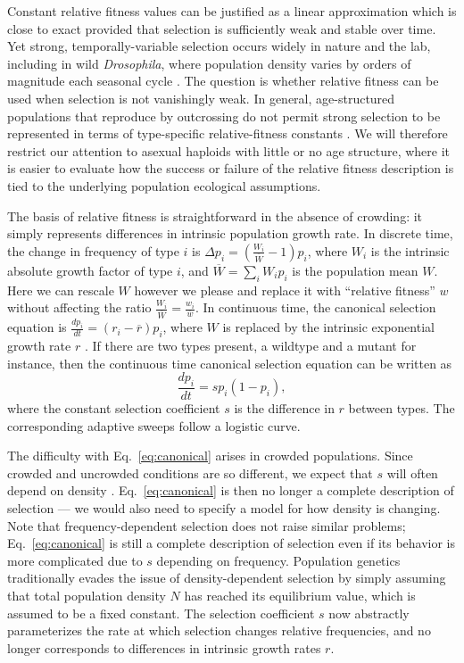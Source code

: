 \documentclass[12pt]{article}
\begin{document}
Constant relative fitness values can be justified as a linear approximation \cite[pp. 277]{ewens_2004} \citep[Chap. 4]{charlesworth_1994} which is close to exact provided that selection is sufficiently weak and stable over time. Yet strong, temporally-variable selection occurs widely in nature and the lab, including in wild \textit{Drosophila}, where population density varies by orders of magnitude each seasonal cycle \citep{messer_2016,bergland_14}. The question is whether relative fitness can be used when selection is not vanishingly weak. In general, age-structured populations that reproduce by outcrossing do not permit strong selection to be represented in terms of type-specific relative-fitness constants \citep[Chap. 4]{charlesworth_1994}. We will therefore restrict our attention to asexual haploids with little or no age structure, where it is easier to evaluate how the success or failure of the relative fitness description is tied to the underlying population ecological assumptions. 

The basis of relative fitness is straightforward in the absence of crowding: it simply represents differences in intrinsic population growth rate. In discrete time, the change in frequency of type $i$ is $\Delta p_i=\left(\frac{W_i}{\overline{W}}-1\right) p_i$, where $W_i$ is the intrinsic absolute growth factor of type $i$, and $\overline{W}=\sum_i W_i p_i$ is the population mean $W$. Here we can rescale $W$ however we please and replace it with ``relative fitness'' $w$ without affecting the ratio $\frac{W_i}{\overline{W}}=\frac{w_i}{\overline{w}}$. In continuous time, the canonical selection equation is $\frac{d p_i}{dt}=(r_i-\overline{r}) p_i$, where $W$ is replaced by the intrinsic exponential growth rate $r$ \citep[pp. 26]{crow_1970}. If there are two types present, a wildtype and a mutant for instance, then the continuous time canonical selection equation can be written as
\begin{equation}
\frac{d p_i}{dt}=s p_i(1-p_i), \label{eq:canonical}
\end{equation}
where the constant selection coefficient $s$ is the difference in $r$ between types. The corresponding adaptive sweeps follow a logistic curve. 

The difficulty with Eq.~\eqref{eq:canonical} arises in crowded populations. Since crowded and uncrowded conditions are so different, we expect that $s$ will often depend on density \citep{travis_2013}. Eq.~\eqref{eq:canonical} is then no longer a complete description of selection --- we would also need to specify a model for how density is changing. Note that frequency-dependent selection does not raise similar problems; Eq.~\eqref{eq:canonical} is still a complete description of selection even if its behavior is more complicated due to $s$ depending on frequency. Population genetics traditionally evades the issue of density-dependent selection by simply assuming that total population density $N$ has reached its equilibrium value, which is assumed to be a fixed constant. The selection coefficient $s$ now abstractly parameterizes the rate at which selection changes relative frequencies, and no longer corresponds to differences in intrinsic growth rates $r$. 
\end{document}
